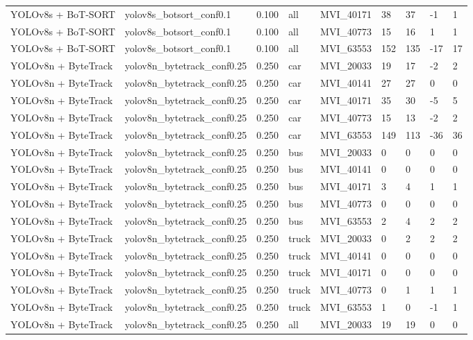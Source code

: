 \begin{tabular}{lllllllll}
YOLOv8s + BoT-SORT & yolov8s\_botsort\_conf0.1 & 0.100 & all & MVI\_40171 & 38 & 37 & -1 & 1 \\
YOLOv8s + BoT-SORT & yolov8s\_botsort\_conf0.1 & 0.100 & all & MVI\_40773 & 15 & 16 & 1 & 1 \\
YOLOv8s + BoT-SORT & yolov8s\_botsort\_conf0.1 & 0.100 & all & MVI\_63553 & 152 & 135 & -17 & 17 \\
YOLOv8n + ByteTrack & yolov8n\_bytetrack\_conf0.25 & 0.250 & car & MVI\_20033 & 19 & 17 & -2 & 2 \\
YOLOv8n + ByteTrack & yolov8n\_bytetrack\_conf0.25 & 0.250 & car & MVI\_40141 & 27 & 27 & 0 & 0 \\
YOLOv8n + ByteTrack & yolov8n\_bytetrack\_conf0.25 & 0.250 & car & MVI\_40171 & 35 & 30 & -5 & 5 \\
YOLOv8n + ByteTrack & yolov8n\_bytetrack\_conf0.25 & 0.250 & car & MVI\_40773 & 15 & 13 & -2 & 2 \\
YOLOv8n + ByteTrack & yolov8n\_bytetrack\_conf0.25 & 0.250 & car & MVI\_63553 & 149 & 113 & -36 & 36 \\
YOLOv8n + ByteTrack & yolov8n\_bytetrack\_conf0.25 & 0.250 & bus & MVI\_20033 & 0 & 0 & 0 & 0 \\
YOLOv8n + ByteTrack & yolov8n\_bytetrack\_conf0.25 & 0.250 & bus & MVI\_40141 & 0 & 0 & 0 & 0 \\
YOLOv8n + ByteTrack & yolov8n\_bytetrack\_conf0.25 & 0.250 & bus & MVI\_40171 & 3 & 4 & 1 & 1 \\
YOLOv8n + ByteTrack & yolov8n\_bytetrack\_conf0.25 & 0.250 & bus & MVI\_40773 & 0 & 0 & 0 & 0 \\
YOLOv8n + ByteTrack & yolov8n\_bytetrack\_conf0.25 & 0.250 & bus & MVI\_63553 & 2 & 4 & 2 & 2 \\
YOLOv8n + ByteTrack & yolov8n\_bytetrack\_conf0.25 & 0.250 & truck & MVI\_20033 & 0 & 2 & 2 & 2 \\
YOLOv8n + ByteTrack & yolov8n\_bytetrack\_conf0.25 & 0.250 & truck & MVI\_40141 & 0 & 0 & 0 & 0 \\
YOLOv8n + ByteTrack & yolov8n\_bytetrack\_conf0.25 & 0.250 & truck & MVI\_40171 & 0 & 0 & 0 & 0 \\
YOLOv8n + ByteTrack & yolov8n\_bytetrack\_conf0.25 & 0.250 & truck & MVI\_40773 & 0 & 1 & 1 & 1 \\
YOLOv8n + ByteTrack & yolov8n\_bytetrack\_conf0.25 & 0.250 & truck & MVI\_63553 & 1 & 0 & -1 & 1 \\
YOLOv8n + ByteTrack & yolov8n\_bytetrack\_conf0.25 & 0.250 & all & MVI\_20033 & 19 & 19 & 0 & 0 \\

\end{tabular}
